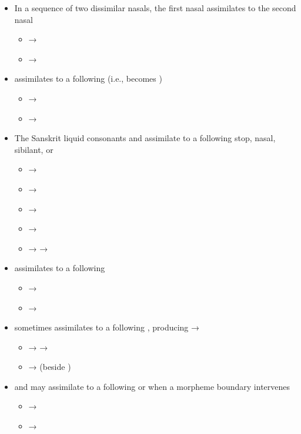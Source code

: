 \begin{itemize}
	\item In a sequence of two dissimilar nasals, the first nasal assimilates to the second nasal
		\begin{itemize}
			\item {} → 
			\item {} → 
		\end{itemize}
	\item {} assimilates to a following  (i.e.,  becomes )
		\begin{itemize}
			\item {} → 
			\item {} → 
		\end{itemize}
	\item The Sanskrit liquid consonants  and  assimilate to a following stop, nasal, sibilant, or 
		\begin{itemize}
			\item {} → 
			\item {} → 
			\item {} → 
			\item {} → 
			\item {} →  → 
		\end{itemize}
	\item {} assimilates to a following 
		\begin{itemize}
			\item {} → 
			\item {} → 
		\end{itemize}
	\item {} sometimes assimilates to a following , producing  → 
		\begin{itemize}
			\item {} →  → 
			\item {} →  (beside )
		\end{itemize}
	\item {} and  may assimilate to a following  or  when a morpheme boundary intervenes
		\begin{itemize}
			\item {} → 
			\item {} → 
		\end{itemize}
\end{itemize}

